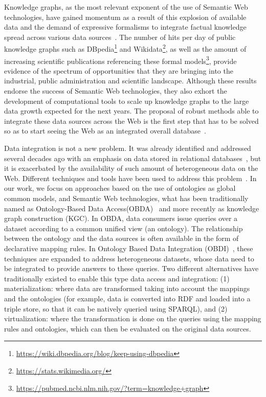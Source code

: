 Knowledge graphs, as the most relevant exponent of the use of Semantic Web technologies, have gained momentum as a result of this explosion of available data and the demand of expressive formalisms to integrate factual knowledge spread across various data sources~\citep{abs-2003-02320}. The number of hits per day of public knowledge graphs such as DBpedia\footnote{\url{https://wiki.dbpedia.org/blog/keep-using-dbpedia}} and Wikidata\footnote{\url{https://stats.wikimedia.org/}}, as well as the amount of increasing scientific publications referencing these formal models\footnote{\url{https://pubmed.ncbi.nlm.nih.gov/?term=knowledge+graph}}, provide evidence of the spectrum of opportunities that they are bringing into the industrial, public administration and scientific landscape. Although these results endorse the success of Semantic Web technologies, they also exhort the development of computational tools to scale up knowledge graphs to the large data growth expected for the next years. The proposal of robust methods able to integrate these data sources across the Web is the first step that has to be solved so as to start seeing the Web as an integrated overall database~\citep{bizer2011linked}.


Data integration is not a new problem. It was already identified and addressed several decades ago with an emphasis on data stored in relational databases~\citep{wiederhold1992mediators}, but it is exacerbated by the availability of such amount of heterogeneous data on the Web. Different techniques and tools have been used to address this problem~\citep{gruser1998wrapper,Lenzerini02,Halevy18}. In our work, we focus on approaches based on the use of ontologies as global common models, and Semantic Web technologies, what has been traditionally named as Ontology-Based Data Access(OBDA)~\citep{poggi2008linking} and more recently as knowledge graph construction (KGC). In OBDA, data consumers issue queries over a dataset according to a common unified view (an ontology). The relationship between the ontology and the data sources is often available in the form of declarative mapping rules. In Ontology Based Data Integration (OBDI)~\citep{poggi2008linking}, these techniques are expanded to address heterogeneous datasets, whose data need to be integrated to provide answers to these queries. Two different alternatives have traditionally existed to enable this type data access and integration: (1) materialization: where data are transformed taking into account the mappings and the ontologies (for example, data is converted into RDF and loaded into a triple store, so that it can be natively queried using SPARQL), and (2) virtualization: where the transformation is done on the queries using the mapping rules and ontologies, which can then be evaluated on the original data sources. 


